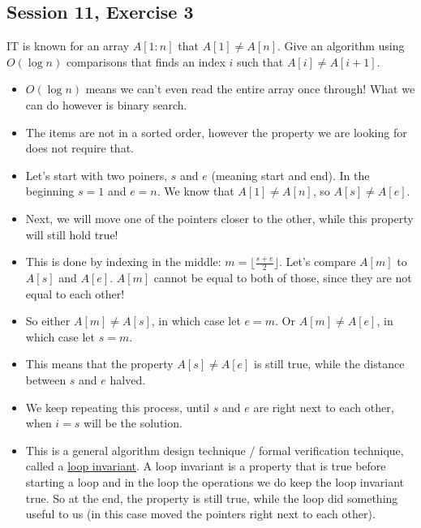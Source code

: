 \subsection {Session 11, Exercise 3}


IT is known for an array $A[1:n]$ that $A[1] \neq{} A[n]$. Give an algorithm using $O(\log{}n)$ comparisons that finds an index $i$ such that $A[i] \neq{} A[i+1]$.


\begin{itemize}
    \item $O(\log{}n)$ means we can't even read the entire array once through! What we can do however is binary search.
    \item The items are not in a sorted order, however the property we are looking for does not require that.
    \item Let's start with two poiners, $s$ and $e$ (meaning start and end). In the beginning $s=1$ and $e=n$. We know that $A[1] \neq{} A[n]$, so $A[s] \neq{} A[e]$.
    \item Next, we will move one of the pointers closer to the other, while this property will still hold true!
    \item This is done by indexing in the middle: $m = \lfloor{}\frac{s + e}{2}\rfloor{}$. Let's compare $A[m]$ to $A[s]$ and $A[e]$. $A[m]$ cannot be equal to both of those, since they are not equal to each other!
    \item So either $A[m]\neq{}A[s]$, in which case let $e = m$. Or $A[m]\neq{}A[e]$, in which case let $s = m$.
    \item This means that the property $A[s] \neq{} A[e]$ is still true, while the distance between $s$ and $e$ halved.
    \item We keep repeating this process, until $s$ and $e$ are right next to each other, when $i=s$ will be the solution.
    \item This is a general algorithm design technique / formal verification technique, called a \href{https://en.wikipedia.org/wiki/Loop_invariant}{loop invariant}. A loop invariant is a property that is true before starting a loop and in the loop the operations we do keep the loop invariant true. So at the end, the property is still true, while the loop did something useful to us (in this case moved the pointers right next to each other).
\end{itemize}

